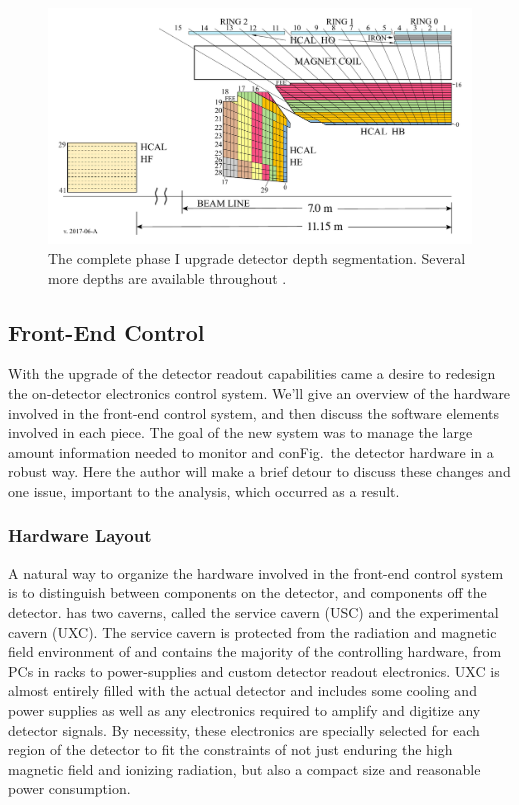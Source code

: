 \begin{figure}[!tp]
    \centering
    \includegraphics[width=\textwidth]{figures/HCAL-Depth-Segmentation-Phase1-HBHE-View-HBHEHFHO-v201706A.pdf}
    \caption[
       \HCAL phase I upgrade depth segmentation.
    ]{
       The complete phase I upgrade \HCAL detector depth segmentation.  Several more depths are available throughout \HCAL. 
    }
    \label{fig:HCALdepthsPhaseI}
\end{figure}

\subsection{Front-End Control}
With the upgrade of the \HCAL detector readout capabilities came a desire to redesign the on-detector electronics control system.  We'll give an overview of the hardware involved in the front-end control system, and then discuss the software elements involved in each piece. The goal of the new system was to manage the large amount information needed to monitor and conFig.~the detector hardware in a robust way.  Here the author will make a brief detour to discuss these changes and one issue, important to the analysis, which occurred as a result.
\subsubsection{Hardware Layout}
A natural way to organize the hardware involved in the \HCAL front-end control system is to distinguish between components on the detector, and components off the detector.  \CMS has two caverns, called the service cavern (USC) and the experimental cavern (UXC).  The service cavern is protected from the radiation and magnetic field environment of \CMS and contains the majority of the controlling hardware, from PCs in racks to power-supplies and custom detector readout electronics.  UXC is almost entirely filled with the actual \CMS detector and includes some cooling and power supplies as well as any electronics required to amplify and digitize any detector signals.  By necessity, these electronics are specially selected for each region of the detector to fit the constraints of not just enduring the high magnetic field and ionizing radiation, but also a compact size and reasonable power consumption.


